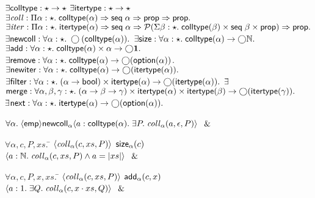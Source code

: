 \begin{figure}
\mbox{}
\begin{specification}
$\exists \mathsf{colltype} : \star \to \star$  
$\exists \mathsf{itertype} : \star \to \star$  
$\exists \mathit{coll} : 
        \Pi \alpha:\star.\; \mathsf{colltype}(\alpha) \Rightarrow \mathsf{seq}\;{\alpha} \Rightarrow \mathsf{prop} \Rightarrow \mathsf{prop}.$ 
$\exists \mathit{iter} : 
        \Pi \alpha:\star.\; \mathsf{itertype}(\alpha) \Rightarrow \mathsf{seq}\;{\alpha} \Rightarrow \mathcal{P}(\Sigma \beta:\star.\; \mathsf{colltype}(\beta) \times \mathsf{seq}\;{\beta} \times \mathsf{prop}) \Rightarrow \mathsf{prop}.$ 
$\exists \mathsf{newcoll} : 
         \forall \alpha:\star.\; \bigcirc{(\mathsf{colltype}(\alpha))}.$
 $\exists \mathsf{size} : 
         \forall \alpha:\star.\; \mathsf{colltype}(\alpha) \to \bigcirc{\mathbb{N}}.$ 
 $\exists \mathsf{add} : 
         \forall \alpha:\star.\; \mathsf{colltype}(\alpha) \times \alpha \to \bigcirc{\mathbf{1}}.$
 $\exists \mathsf{remove} :
         \forall \alpha:\star.\; \mathsf{colltype}(\alpha) \to \bigcirc{(\mathsf{option }{(\alpha)})}$. 
 $\exists \mathsf{newiter} : 
         \forall \alpha:\star.\; \mathsf{colltype}(\alpha) \to \bigcirc{(\mathsf{itertype}(\alpha))}.$ 
 $\exists \mathsf{filter} : 
         \forall \alpha:\star.\; (\alpha \to \mathsf{bool}) \times \mathsf{itertype}(\alpha) 
                                 \to \bigcirc{(\mathsf{itertype}(\alpha))}.$ 
$\exists$\=$ \mathsf{merge} : 
         \forall \alpha,\beta,\gamma:\star.\; (\alpha \to \beta \to \gamma) \times
                                 \mathsf{itertype}(\alpha) \times \mathsf{itertype}(\beta) 
                                   \to \bigcirc{(\mathsf{itertype}(\gamma))}.$
$\exists$\=$\mathsf{next} : 
         \forall \alpha:\star.\; \mathsf{itertype}(\alpha) \to \bigcirc{(\mathsf{option }{(\alpha)})}.$  

\> $\forall \alpha.\; \langle{\mathsf{emp}}\rangle{{\mathsf{newcoll}_\alpha}}\langle{a:\mathsf{colltype}(\alpha)}.\;{\exists P.\; \mathit{coll}_\alpha(a, \epsilon,P)}\rangle$ $\;\&\;$ 

\> $\forall \alpha, c, P, xs.\;$\=
         $\left<{\mathit{coll}_\alpha(c, xs, P)}\right>$
\nextline
\> \>  ${\mathsf{size}_\alpha(c)}$ 
\nextline
\> \>  $\left<{a:\mathbb{N}.\; \mathit{coll}_\alpha(c, xs, P) \land a = |xs|}\right>$  $\;\&\;$ 

 \> $\forall \alpha, c, P, x, xs.\;$\=
               $\left<{\mathit{coll}_\alpha(c, xs, P)}\right>$ 
\nextline
\>\>         ${\mathsf{add}_\alpha(c, x)}$
\nextline
\>\>         $\left<{a:1.\; \exists Q.\; \mathit{coll}_\alpha(c, x\cdot xs, Q)}\right>$ $\;\&\;$ 


\end{specification}
\end{figure}
